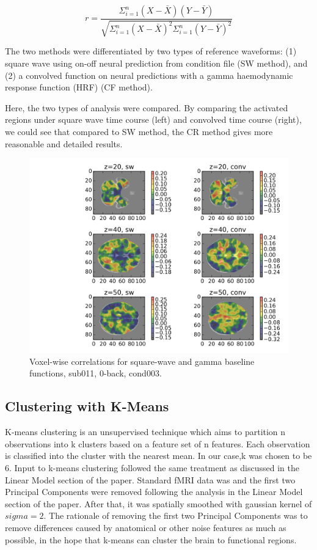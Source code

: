 \documentclass[11pt]{article}
\begin{document}
\begin{equation}
r = \frac{\Sigma_{i=1}^{n}  ( X-\bar{X}) ( Y-\bar{Y})}{\sqrt{ \Sigma_{i=1}^{n} (
    X-\bar{X} ) ^2 \Sigma_{i=1}^{n} ( Y-\bar{Y})  ^2 }}
\end{equation}

The two methods were differentiated by two types of reference
waveforms: (1) square wave using on-off neural prediction from condition file
(SW method), and (2) a convolved function on neural predictions with a gamma
haemodynamic response function (HRF) (CF method).

Here, the two types of analysis were compared. By comparing
the activated regions under square wave time course (left) and convolved time
course (right), we could see that compared to SW method, the CR method gives 
more reasonable and detailed results.

\begin{figure}[H]
\centering
\includegraphics[scale=0.7]{../results/sub011_voxel_wise_correlation_across_methods.png}
\caption{Voxel-wise correlations for square-wave and gamma baseline functions, sub011, 0-back, cond003.}
\end{figure} 

\subsection{Clustering with K-Means}

K-means clustering is an unsupervised technique which aims to partition n
observations into k clusters based on a feature set of n features. Each
observation is classified into the cluster with the nearest mean. In our case,k was
chosen to be 6. Input to k-means clustering followed the same treatment as discussed
in the Linear Model section of the paper. Standard fMRI data was and the first two 
Principal Components were removed following the analysis in the Linear Model section 
of the paper. After that, it was spatially smoothed with gaussian kernel
of $sigma=2$. The rationale of removing the first two Principal Components was to
remove differences caused by anatomical or other noise features as much as possible, in
the hope that k-means can cluster the brain to functional regions.
\end{document}
